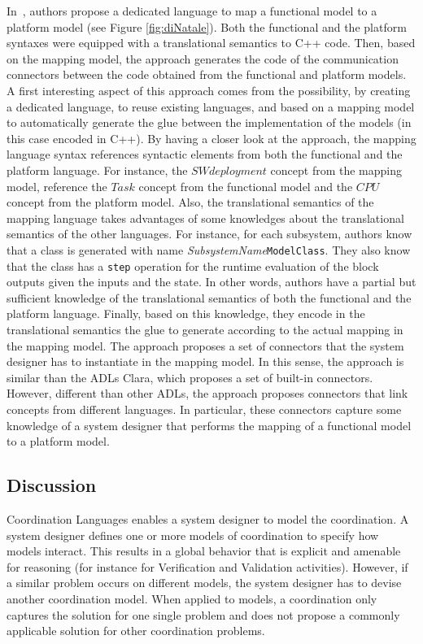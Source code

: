 In~\cite{dinatale}, authors propose a dedicated language to map a functional model to a platform model (see Figure \ref{fig:diNatale}). Both the functional and the platform syntaxes were equipped with a translational semantics to C++ code. Then, based on the mapping model, the approach generates the code of the communication connectors between the code obtained from the functional and platform models. A first interesting aspect of this approach comes from the possibility, by creating a dedicated language, to reuse existing languages, and based on a mapping model to automatically generate the glue between the implementation of the models (in this case encoded in C++). By having a closer look at the approach, the mapping language syntax references syntactic elements from both the functional and the platform language. For instance, the $SWdeployment$ concept from the mapping model, reference the $Task$ concept from the functional model and the $CPU$ concept from the platform model. Also, the translational semantics of the mapping language takes advantages of some knowledges about the translational semantics of the other languages. For instance, for each subsystem, authors know that a class is generated with name \emph{SubsystemName}\texttt{ModelClass}. They also know that the class has a \texttt{step} operation for the runtime evaluation of the block outputs given the inputs and the state. In other words, authors have a partial but sufficient knowledge of the translational semantics of both the functional and the platform language. Finally, based on this knowledge, they encode in the translational semantics the glue to generate according to the actual mapping in the mapping model. The approach proposes a set of connectors that the system designer has to instantiate in the mapping model. In this sense, the approach is similar than the ADLs Clara, which proposes a set of built-in connectors. However, different than other ADLs, the approach proposes connectors that link concepts from different languages. In particular, these connectors capture some knowledge of a system designer that performs the mapping of a functional model to a platform model.
         	
\subsection{Discussion}


Coordination Languages enables a system designer to model the coordination. A system designer defines one or more models of coordination to specify how models interact. This results in a global behavior that is explicit and amenable for reasoning (for instance for Verification and Validation activities). However, if a similar problem occurs on different models, the system designer has to devise another coordination model. When applied to models, a coordination only captures the solution for one single problem and does not propose a commonly applicable solution for other coordination problems.
		

